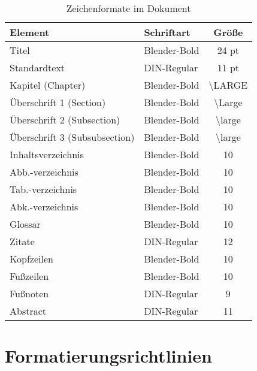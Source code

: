 \begin{table}[h]
	\centering
	\caption{Zeichenformate im Dokument}
	\label{tab:zeichenformate}
	\begin{tabular}{|l|l|c|}
		\hline
		\textbf{Element}              & \textbf{Schriftart} & \textbf{Größe}       \\
		\hline
		Titel                         & Blender-Bold        & 24 pt                \\
		Standardtext                  & DIN-Regular         & 11 pt                \\
		Kapitel (Chapter)             & Blender-Bold        & \textbackslash LARGE \\
		Überschrift 1 (Section)       & Blender-Bold        & \textbackslash Large \\
		Überschrift 2 (Subsection)    & Blender-Bold        & \textbackslash large \\
		Überschrift 3 (Subsubsection) & Blender-Bold        & \textbackslash large \\
		\hline
		Inhaltsverzeichnis            & Blender-Bold        & 10                   \\
		Abb.-verzeichnis              & Blender-Bold        & 10                   \\
		Tab.-verzeichnis              & Blender-Bold        & 10                   \\
		Abk.-verzeichnis              & Blender-Bold        & 10                   \\
		Glossar                       & Blender-Bold        & 10                   \\
		\hline
		Zitate                        & DIN-Regular         & 12                   \\
		Kopfzeilen                    & Blender-Bold        & 10                   \\
		Fußzeilen                     & Blender-Bold        & 10                   \\
		Fußnoten                      & DIN-Regular         & 9                    \\
		Abstract                      & DIN-Regular         & 11                   \\
		\hline
	\end{tabular}
\end{table}

\section{Formatierungsrichtlinien}
\label{sec:formatierungsrichtlinien}

